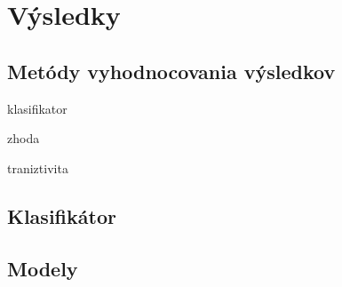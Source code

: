 \chapter{Výsledky}

\section{Metódy vyhodnocovania výsledkov}
\todo klasifikator

\todo zhoda

\todo traniztivita

\section{Klasifikátor}

\section{Modely}
